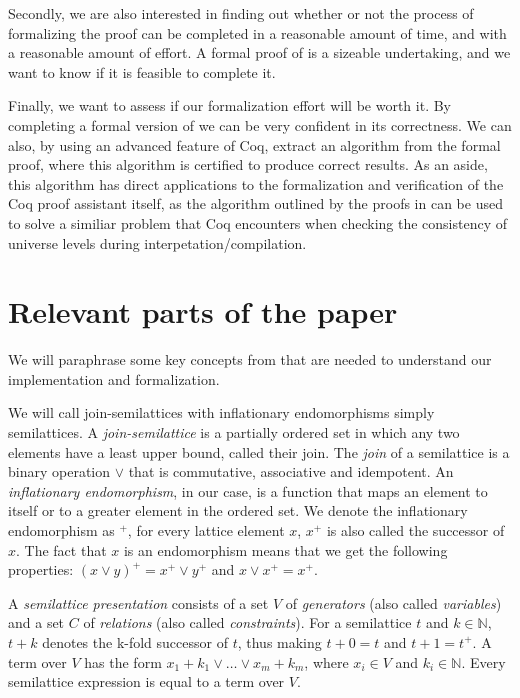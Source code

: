 Secondly, we are also interested in finding out whether or not the process of formalizing the proof
can be completed in a reasonable amount of time, and with a reasonable amount of effort.
A formal proof of  is a sizeable undertaking, and we want to know if it is feasible to complete it.

Finally, we want to assess if our formalization effort will be worth it.
By completing a formal version of  we can be very confident in its correctness.
We can also, by using an advanced feature of Coq, extract an algorithm from the formal proof,
where this algorithm is certified to produce correct results.
As an aside, this algorithm has direct applications to the formalization and verification of the Coq proof assistant itself,
as the algorithm outlined by the proofs in \cite{mbezem} can be used to solve a similiar problem that Coq encounters when
checking the consistency of universe levels during interpetation/compilation.

\section{Relevant parts of the paper}
\label{sec:relevant_parts_of_the_paper}

We will paraphrase some key concepts from \cite{mbezem} that are needed to understand
our implementation and formalization.

We will call join-semilattices with inflationary endomorphisms simply semilattices.
A \emph{join-semilattice} is a partially ordered set in which any two elements have a least upper bound,
called their join.
The \emph{join} of a semilattice is a binary operation $\lor$ that is commutative, associative and idempotent.
An \emph{inflationary endomorphism}, in our case, is a function
that maps an element to itself or to a greater element in the ordered set.
We denote the inflationary endomorphism as $^+$, for every lattice element $x$,
$x^+$ is also called the successor of $x$.
The fact that $x$ is an endomorphism means that we get the following properties:
$(x \lor y)^+ = x^+ \lor y^+$ and $x \lor x^+ = x^+$.


A \emph{semilattice presentation} consists of a set $V$ of \emph{generators}
(also called \emph{variables}) and a set $C$ of \emph{relations}
(also called \emph{constraints}).
For a semilattice $t$ and $k \in \mathbb{N}$, $t + k$ denotes the k-fold successor of $t$, thus making $t + 0 = t$ and $t + 1 = t^+$.
A term over $V$ has the form $x_1 + k_1 \lor \ldots \lor x_m + k_m$, where $x_i \in V$ and $k_i \in \mathbb{N}$.
Every semilattice expression is equal to a term over $V$.

